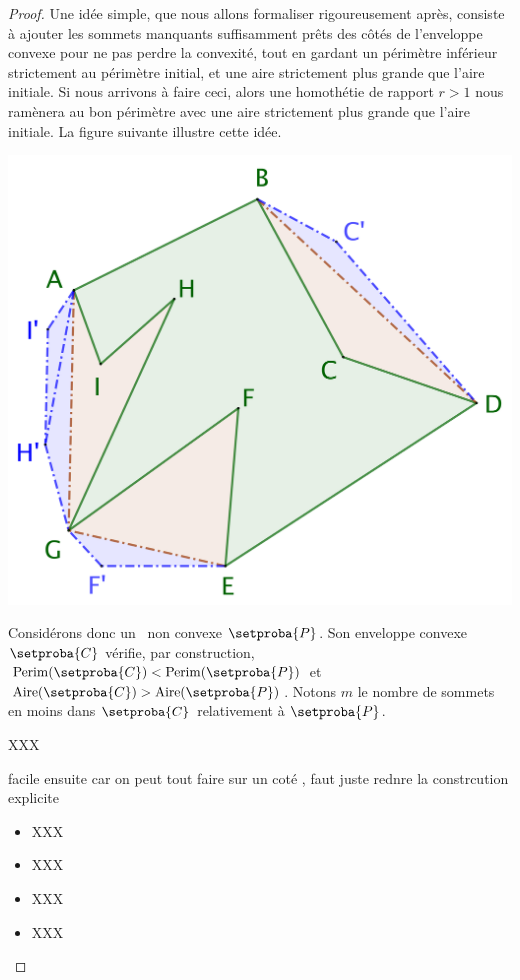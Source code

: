 \begin{proof}
	Une idée simple, que nous allons formaliser rigoureusement après, consiste à ajouter les sommets manquants suffisamment prêts des côtés de l'enveloppe convexe pour ne pas perdre la convexité, tout en gardant un périmètre inférieur strictement au périmètre initial, et une aire strictement plus grande que l'aire initiale. Si nous arrivons à faire ceci, alors une homothétie de rapport $r > 1$ nous ramènera au bon périmètre avec une aire strictement plus grande que l'aire initiale.
	La figure suivante illustre cette idée.	
	
	\begin{center}
		\includegraphics[scale=.4]{content/polygon/polygon-convex-hull-distortion.png}
	\end{center}


	Considérons donc un \ngone\ non convexe $\setproba{P}$. Son enveloppe convexe $\setproba{C}$ vérifie, par construction,
	$\perim{\setproba{C}} < \perim{\setproba{P}}$ 
	et 
	$\area{\setproba{C}} > \area{\setproba{P}}$.
	Notons $m$ le nombre de sommets en moins dans $\setproba{C}$ relativement à $\setproba{P}$.
	

	XXX
	
	facile ensuite car on peut tout faire sur un coté , faut juste rednre la constrcution explicite
	
	
	\begin{itemize}
		\item XXX

		\item XXX

		\item XXX

		\item XXX
	\end{itemize}
\end{proof}


